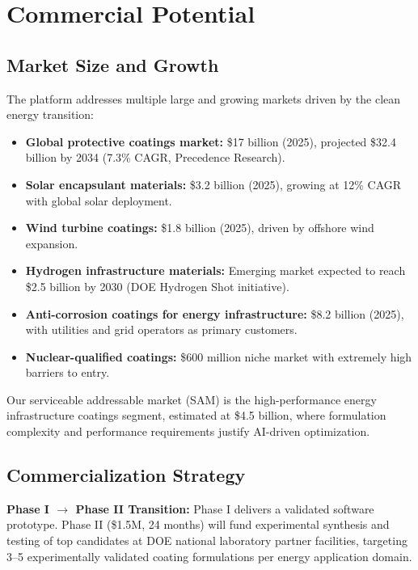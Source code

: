 \documentclass[11pt,letterpaper]{article}
\begin{document}
\section{Commercial Potential}
\label{sec:commercial}

\subsection{Market Size and Growth}

The platform addresses multiple large and growing markets driven by the clean energy transition:

\begin{itemize}[noitemsep]
  \item \textbf{Global protective coatings market:} \$17 billion (2025), projected \$32.4 billion by 2034 (7.3\% CAGR, Precedence Research).
  \item \textbf{Solar encapsulant materials:} \$3.2 billion (2025), growing at 12\% CAGR with global solar deployment.
  \item \textbf{Wind turbine coatings:} \$1.8 billion (2025), driven by offshore wind expansion.
  \item \textbf{Hydrogen infrastructure materials:} Emerging market expected to reach \$2.5 billion by 2030 (DOE Hydrogen Shot initiative).
  \item \textbf{Anti-corrosion coatings for energy infrastructure:} \$8.2 billion (2025), with utilities and grid operators as primary customers.
  \item \textbf{Nuclear-qualified coatings:} \$600 million niche market with extremely high barriers to entry.
\end{itemize}

Our serviceable addressable market (SAM) is the high-performance energy infrastructure coatings segment, estimated at \$4.5 billion, where formulation complexity and performance requirements justify AI-driven optimization.

\subsection{Commercialization Strategy}

\textbf{Phase I $\rightarrow$ Phase II Transition:} Phase I delivers a validated software prototype. Phase II (\$1.5M, 24 months) will fund experimental synthesis and testing of top candidates at DOE national laboratory partner facilities, targeting 3--5 experimentally validated coating formulations per energy application domain.
\end{document}
